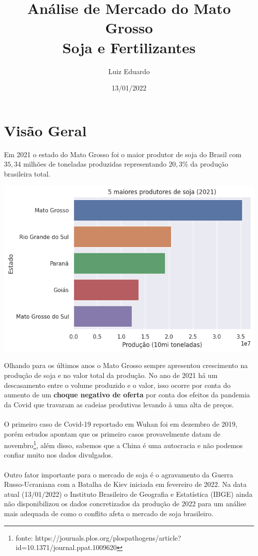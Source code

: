 \documentclass{article}
\title{Análise de Mercado do Mato Grosso \\
 Soja e Fertilizantes}
\author{Luiz Eduardo }
\date{13/01/2022}
\begin{document}
\maketitle

\section*{Visão Geral}
Em 2021 o estado do Mato Grosso foi o maior produtor de soja do Brasil com $35,34$ milhões de toneladas produzidas representando $20,3\%$ da produção brasileira total.
\begin{center}
\includegraphics[scale=0.6]{top5_prod_soja_br.png}
\end{center}
Olhando para os últimos anos o Mato Grosso sempre apresentou crescimento na produção de soja e no valor total da produção. No ano de 2021 há um descasamento entre o volume produzido e o valor, isso ocorre por conta do aumento de um \textbf{choque negativo de oferta} por conta dos efeitos da pandemia da Covid que travaram as cadeias produtivas levando à uma alta de preços.
\\~\\
O primeiro caso de Covid-19 reportado em Wuhan foi em dezembro de 2019, porém estudos apontam que os primeiro casos provavelmente datam de novembro\footnote{fonte: https://journals.plos.org/plospathogens/article?id=10.1371/journal.ppat.1009620}, além disso, sabemos que a China é uma autocracia e não podemos confiar muito nos dados divulgados.
\\~\\
Outro fator importante para o mercado de soja é o agravamento da Guerra Russo-Ucraniana com a Batalha de Kiev iniciada em fevereiro de 2022. Na data atual (13/01/2022) o Instituto Brasileiro de Geografia e Estatística (IBGE) ainda não disponibilizou os dados concretizados da produção de 2022 para um análise mais adequada de como o conflito afeta o mercado de soja brasileiro.
\end{document}
